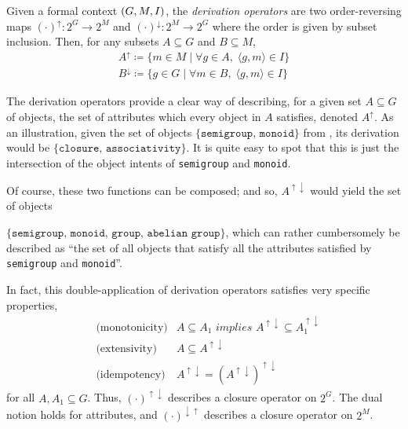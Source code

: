 \begin{definition}
  \label{definition:derivation-operators}
  Given a formal context $(G,M,I)$, the \textit{derivation operators} are two order-reversing maps $(\cdot)^\uparrow : 2^G \to 2^M$ and $(\cdot)^\downarrow : 2^M \to 2^G$ where the order is given by subset inclusion. Then, for any subsets $A \subseteq G$ and $B \subseteq M$,
  \begin{align*}
    A^\uparrow \coloneqq \{m \in M \mid \forall g \in A, \; \langle g,m \rangle \in I\} \\
    B^\downarrow \coloneqq \{g \in G \mid \forall m \in B, \; \langle g,m \rangle \in I\}
  \end{align*}
\end{definition}

The derivation operators provide a clear way of describing, for a given set $A\subseteq G$ of objects, the set of attributes which every object in $A$ satisfies, denoted $A^\uparrow$. As an illustration, given the set of objects $\{\texttt{semigroup, monoid}\}$ from , its derivation would be $\{\texttt{closure, associativity}\}$. It is quite easy to spot that this is just the intersection of the object intents of \texttt{semigroup} and \texttt{monoid}.

Of course, these two functions can be composed; and so, $A^{\uparrow \downarrow}$ would yield the set of objects 

$\{\texttt{semigroup, monoid, group, abelian group}\}$, which can rather cumbersomely be described as ``the set of all  objects that satisfy all the attributes satisfied by \texttt{semigroup} and \texttt{monoid}''.


In fact, this double-application of derivation operators satisfies very specific properties,
\begin{align}
  & \text{(monotonicity)} & A \subseteq A_1 \textit{ implies } A^{\uparrow \downarrow} \subseteq A_1^{\uparrow \downarrow} \\
  & \text{(extensivity)}  & A \subseteq A^{\uparrow \downarrow} \\
  & \text{(idempotency)}  & A^{\uparrow \downarrow} = (A^{\uparrow \downarrow})^{\uparrow \downarrow}
\end{align}
for all $A, A_1 \subseteq G$. Thus, $(\cdot)^{\uparrow \downarrow}$ describes a closure operator on $2^G$. The dual notion holds for attributes, and $(\cdot)^{\downarrow \uparrow}$ describes a closure operator on $2^M$.

